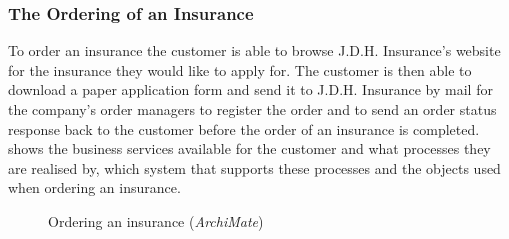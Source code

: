 \subsubsection{The Ordering of an Insurance}
\label{sec:order}
To order an insurance the customer is able to browse J.D.H. Insurance's website for the insurance they would like to apply for. The customer is then able to download a paper application form and send it to J.D.H. Insurance by mail for the company's order managers to register the order and to send an order status response back to the customer before the order of an insurance is completed.  shows the business services available for the customer and what processes they are realised by, which system that supports these processes and the objects used when ordering an insurance.
\begin{center}
	\begin{figure}[H]
		\centering
		\setlength\fboxsep{7pt}
		\setlength\fboxrule{0.5pt}
		\caption{Ordering an insurance (\emph{ArchiMate})}
		\label{fig:archi_order}
	\end{figure}
\end{center}
